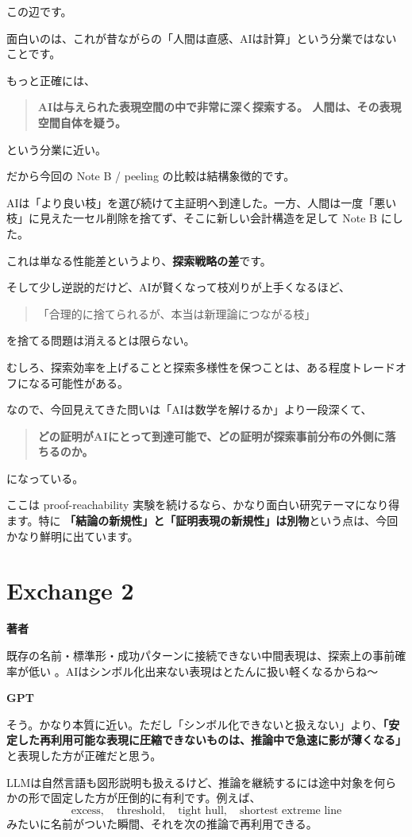 \documentclass[11pt,a4paper]{article}
\newcommand{\speaker}[1]{\par\medskip\noindent\textsf{\bfseries #1}\par\smallskip}
\begin{document}
この辺です。

面白いのは、これが昔ながらの「人間は直感、AIは計算」という分業ではないことです。

もっと正確には、
\begin{quote}
\textbf{AIは与えられた表現空間の中で非常に深く探索する。  
人間は、その表現空間自体を疑う。}
\end{quote}
という分業に近い。

だから今回の Note B / peeling の比較は結構象徴的です。

AIは「より良い枝」を選び続けて主証明へ到達した。一方、人間は一度「悪い枝」に見えた一セル削除を捨てず、そこに新しい会計構造を足して Note B にした。

これは単なる性能差というより、\textbf{探索戦略の差}です。

そして少し逆説的だけど、AIが賢くなって枝刈りが上手くなるほど、
\begin{quote}
「合理的に捨てられるが、本当は新理論につながる枝」
\end{quote}
を捨てる問題は消えるとは限らない。

むしろ、探索効率を上げることと探索多様性を保つことは、ある程度トレードオフになる可能性がある。

なので、今回見えてきた問いは「AIは数学を解けるか」より一段深くて、
\begin{quote}
\textbf{どの証明がAIにとって到達可能で、どの証明が探索事前分布の外側に落ちるのか。}
\end{quote}
になっている。

ここは proof-reachability 実験を続けるなら、かなり面白い研究テーマになり得ます。特に \textbf{「結論の新規性」と「証明表現の新規性」は別物}という点は、今回かなり鮮明に出ています。

\section*{Exchange 2}
\speaker{著者}
既存の名前・標準形・成功パターンに接続できない中間表現は、探索上の事前確率が低い 。AIはシンボル化出来ない表現はとたんに扱い軽くなるからね～

\speaker{GPT}
そう。かなり本質に近い。ただし「シンボル化できないと扱えない」より、\textbf{「安定した再利用可能な表現に圧縮できないものは、推論中で急速に影が薄くなる」}と表現した方が正確だと思う。

LLMは自然言語も図形説明も扱えるけど、推論を継続するには途中対象を何らかの形で固定した方が圧倒的に有利です。例えば、
\[
\text{excess},\quad
\text{threshold},\quad
\text{tight hull},\quad
\text{shortest extreme line}
\]
みたいに名前がついた瞬間、それを次の推論で再利用できる。
\end{document}
